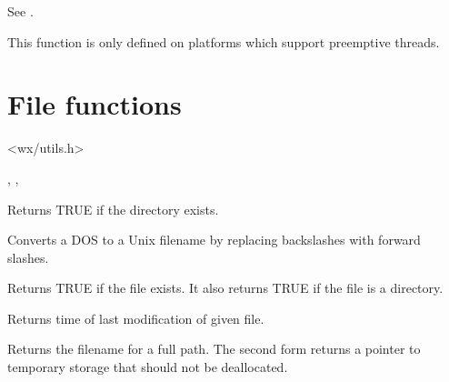 
See .

This function is only defined on platforms which support preemptive
threads.

\section{File functions}\label{filefunctions}


<wx/utils.h>


, , 



Returns TRUE if the directory exists.



Converts a DOS to a Unix filename by replacing backslashes with forward
slashes.



Returns TRUE if the file exists. It also returns TRUE if the file is
a directory.



Returns time of last modification of given file.





Returns the filename for a full path. The second form returns a pointer to
temporary storage that should not be deallocated.

\label{wxfindfirstfile}


